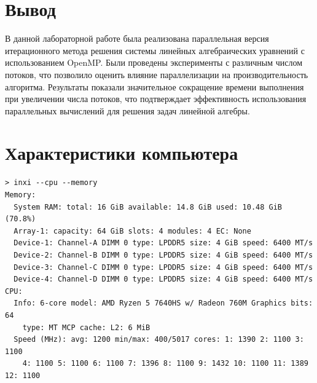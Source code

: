 \documentclass[a4paper, 14pt]{extarticle}
\begin{document}
\section*{Вывод}\label{Sect::conclusion}
В данной лабораторной работе была реализована параллельная версия итерационного метода решения системы линейных алгебраических уравнений с использованием OpenMP. Были проведены эксперименты с различным числом потоков, что позволило оценить влияние параллелизации на производительность алгоритма. Результаты показали значительное сокращение времени выполнения при увеличении числа потоков, что подтверждает эффективность использования параллельных вычислений для решения задач линейной алгебры.

\section*{Характеристики компьютера}

\begin{lstlisting}[caption={Характеристики компьютера}, label={lst:computer_specs}]
> inxi --cpu --memory
Memory:
  System RAM: total: 16 GiB available: 14.8 GiB used: 10.48 GiB (70.8%)
  Array-1: capacity: 64 GiB slots: 4 modules: 4 EC: None
  Device-1: Channel-A DIMM 0 type: LPDDR5 size: 4 GiB speed: 6400 MT/s
  Device-2: Channel-B DIMM 0 type: LPDDR5 size: 4 GiB speed: 6400 MT/s
  Device-3: Channel-C DIMM 0 type: LPDDR5 size: 4 GiB speed: 6400 MT/s
  Device-4: Channel-D DIMM 0 type: LPDDR5 size: 4 GiB speed: 6400 MT/s
CPU:
  Info: 6-core model: AMD Ryzen 5 7640HS w/ Radeon 760M Graphics bits: 64
    type: MT MCP cache: L2: 6 MiB
  Speed (MHz): avg: 1200 min/max: 400/5017 cores: 1: 1390 2: 1100 3: 1100
    4: 1100 5: 1100 6: 1100 7: 1396 8: 1100 9: 1432 10: 1100 11: 1389 12: 1100
\end{lstlisting}
\end{document}
